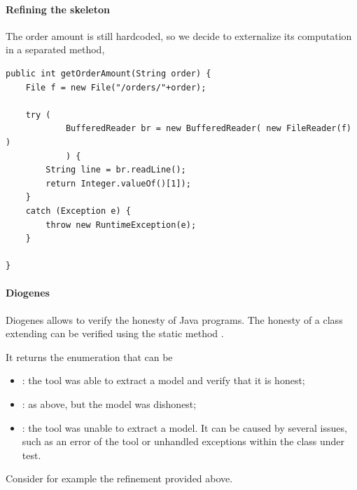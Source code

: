 \paragraph{Refining the skeleton}
The order amount is still hardcoded, so we decide to externalize its computation
in a separated method, \eg
\begin{mdframed}
\begin{verbatim}
public int getOrderAmount(String order) {
    File f = new File("/orders/"+order);
    
    try (
            BufferedReader br = new BufferedReader( new FileReader(f) )
            ) {
        String line = br.readLine();
        return Integer.valueOf()[1]);        
    }
    catch (Exception e) {
        throw new RuntimeException(e);
    }
    
}
\end{verbatim}
\end{mdframed}

\paragraph{Diogenes}
Diogenes allows to verify the honesty of Java programs.
The honesty of a class extending  
can be verified using the static method .

It returns the enumeration  that can be
\begin{itemize}
\item {}: the tool was able to extract a \coco model and verify that it is honest;
\item {}: as above, but the model was dishonest;
\item {}: the tool was unable to extract a model. It can be caused by several issues, such as an error of the tool or unhandled exceptions within the class under test.
\end{itemize}

Consider for example the refinement provided above.

